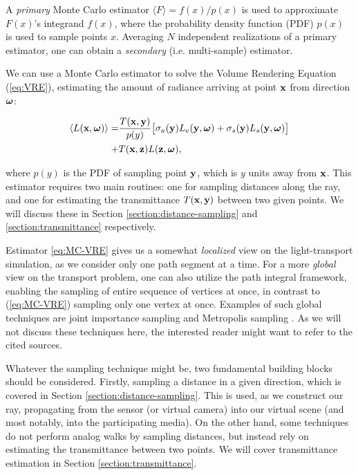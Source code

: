 A \textit{primary} Monte Carlo estimator $\langle F \rangle = f(x) / p(x)$ is used to approximate $F(x)$'s integrand $f(x)$, where the probability density function (PDF) $p(x)$ is used to sample points $x$. Averaging $N$ independent realizations of a primary estimator, one can obtain a \textit{secondary} (i.e. multi-sample) estimator. 

We can use a Monte Carlo estimator to solve the Volume Rendering Equation (\ref{eq:VRE}), estimating the amount of radiance arriving at point $\textbf{x}$ from direction $\boldsymbol{\omega}$:

\begin{align}
\begin{aligned}
\label{eq:MC-VRE}
\langle L(\textbf{x}, \boldsymbol{\omega}) \rangle 
=&
    \frac{T(\textbf{x}, \textbf{y})}{p(y)}
    \big[ 
        \sigma_a(\textbf{y})L_e(\textbf{y}, \boldsymbol{\omega}) + 
        \sigma_s(\textbf{y})L_s(\textbf{y}, \boldsymbol{\omega})
    \big]
    \\ +& 
    T(\textbf{x}, \textbf{z}) L(\textbf{z},\boldsymbol{\omega}),
\end{aligned}
\end{align}

\noindent where $p(y)$ is the PDF of sampling point $\textbf{y}$, which is $y$ units away from $\textbf{x}$. This estimator requires two main routines: one for sampling distances along the ray, and one for estimating the transmittance $T(\textbf{x}, \textbf{y})$ between two given points. We will discuss these in Section \ref{section:distance-sampling} and \ref{section:transmittance} respectively.

Estimator \ref{eq:MC-VRE} gives us a somewhat \textit{localized} view on the light-transport simulation, as we consider only one path segment at a time. For a more \textit{global} view on the transport problem, one can also utilize the path integral framework\cite{MLT-1}, enabling the sampling of entire sequence of vertices at once, in contrast to (\ref{eq:MC-VRE}) sampling only one vertex at once. Examples of such global techniques are joint importance sampling\cite{joint-importance} and Metropolis sampling \cite{MLT-2}. As we will not discuss these techniques here, the interested reader might want to refer to the cited sources.

Whatever the sampling technique might be, two fundamental building blocks should be considered. Firstly, sampling a distance in a given direction, which is covered in Section \ref{section:distance-sampling}. This is used, as we construct our ray, propagating from the sensor (or virtual camera) into our virtual scene (and most notably, into the participating media). On the other hand, some techniques do not perform analog walks by sampling distances, but instead rely on estimating the transmittance between two points. We will cover transmittance estimation in Section \ref{section:transmittance}.